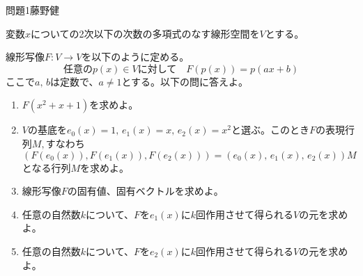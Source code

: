 \documentclass[fleqn]{jbook}
\begin{document}
\begin{question}{問題1}{藤野健}
\setcounter{equation}{0}

変数$x$についての2次以下の次数の多項式のなす線形空間を$V$とする。

線形写像$F:V \longrightarrow V$を以下のように定める。
\[
    \mbox{任意の}p(x) \in V \mbox{に対して} \quad F(p(x)) = p(ax+b) 
\]
ここで$a, \, b$は定数で、$a \neq 1$とする。以下の問に答えよ。

\begin{enumerate}
    \item $F(x^2+x+1)$を求めよ。

    \item $V$の基底を$e_0(x) = 1, \, e_1(x) = x, \, e_2(x) = x^2$と選ぶ。このとき$F$の表現行列$M, すなわち$
\[
    (F(e_0(x)), F(e_1(x)), F(e_2(x))) = (e_0(x), \, e_1(x), \, e_2(x)) M
\]
となる行列$M$を求めよ。

    \item 線形写像$F$の固有値、固有ベクトルを求めよ。

    \item 任意の自然数$k$について、$F$を$e_1(x)$に$k$回作用させて得られる$V$の元を求めよ。

    \item 任意の自然数$k$について、$F$を$e_2(x)$に$k$回作用させて得られる$V$の元を求めよ。
\end{enumerate}

\end{question}

\end{document}
